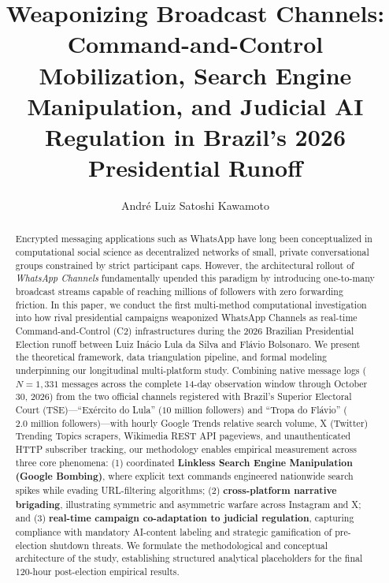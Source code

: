 \documentclass[preprint,12pt]{elsarticle}
\begin{document}
\begin{frontmatter}

\title{Weaponizing Broadcast Channels: Command-and-Control Mobilization, Search Engine Manipulation, and Judicial AI Regulation in Brazil's 2026 Presidential Runoff}

\author[inst1]{André Luiz Satoshi Kawamoto}


\begin{abstract}
Encrypted messaging applications such as WhatsApp have long been conceptualized in computational social science as decentralized networks of small, private conversational groups constrained by strict participant caps. However, the architectural rollout of \textit{WhatsApp Channels} fundamentally upended this paradigm by introducing one-to-many broadcast streams capable of reaching millions of followers with zero forwarding friction. In this paper, we conduct the first multi-method computational investigation into how rival presidential campaigns weaponized WhatsApp Channels as real-time Command-and-Control (C2) infrastructures during the 2026 Brazilian Presidential Election runoff between Luiz Inácio Lula da Silva and Flávio Bolsonaro. We present the theoretical framework, data triangulation pipeline, and formal modeling underpinning our longitudinal multi-platform study. Combining native message logs ($N=1,331$ messages across the complete 14-day observation window through October 30, 2026) from the two official channels registered with Brazil's Superior Electoral Court (TSE)---``Exército do Lula'' ($10\text{ million}$ followers) and ``Tropa do Flávio'' ($2.0\text{ million}$ followers)---with hourly Google Trends relative search volume, X (Twitter) Trending Topics scrapers, Wikimedia REST API pageviews, and unauthenticated HTTP subscriber tracking, our methodology enables empirical measurement across three core phenomena: (1) coordinated \textbf{Linkless Search Engine Manipulation (Google Bombing)}, where explicit text commands engineered nationwide search spikes while evading URL-filtering algorithms; (2) \textbf{cross-platform narrative brigading}, illustrating symmetric and asymmetric warfare across Instagram and X; and (3) \textbf{real-time campaign co-adaptation to judicial regulation}, capturing compliance with mandatory AI-content labeling and strategic gamification of pre-election shutdown threats. We formulate the methodological and conceptual architecture of the study, establishing structured analytical placeholders for the final 120-hour post-election empirical results.
\end{abstract}


\end{frontmatter}
\end{document}
